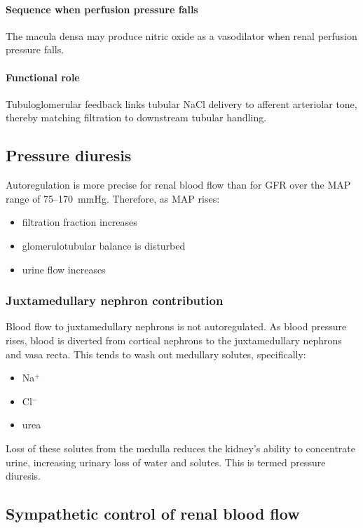 \documentclass[11pt,a4paper]{article}
\begin{document}
\paragraph{Sequence when perfusion pressure falls}

The macula densa may produce nitric oxide as a vasodilator when renal perfusion pressure falls.

\paragraph{Functional role}

Tubuloglomerular feedback links tubular NaCl delivery to afferent arteriolar tone, thereby matching filtration to downstream tubular handling.

\subsection{Pressure diuresis}

Autoregulation is more precise for renal blood flow than for GFR over the MAP range of 75--170~mmHg. Therefore, as MAP rises:
\begin{itemize}
    \item filtration fraction increases
    \item glomerulotubular balance is disturbed
    \item urine flow increases
\end{itemize}

\subsubsection{Juxtamedullary nephron contribution}

Blood flow to juxtamedullary nephrons is not autoregulated. As blood pressure rises, blood is diverted from cortical nephrons to the juxtamedullary nephrons and vasa recta. This tends to wash out medullary solutes, specifically:
\begin{itemize}
    \item Na$^+$
    \item Cl$^-$
    \item urea
\end{itemize}

Loss of these solutes from the medulla reduces the kidney's ability to concentrate urine, increasing urinary loss of water and solutes. This is termed pressure diuresis.

\subsection{Sympathetic control of renal blood flow}
\end{document}
